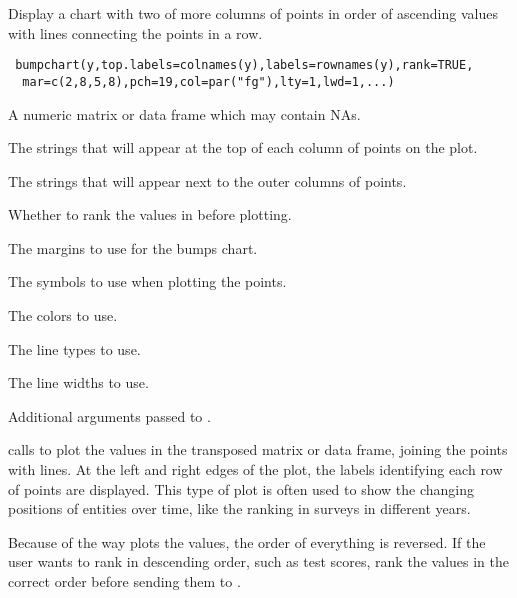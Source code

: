 \begin{Description}\relax
Display a chart with two of more columns of points in order of ascending values
with lines connecting the points in a row.
\end{Description}
\begin{Usage}
\begin{verbatim}
 bumpchart(y,top.labels=colnames(y),labels=rownames(y),rank=TRUE,
  mar=c(2,8,5,8),pch=19,col=par("fg"),lty=1,lwd=1,...)
\end{verbatim}
\end{Usage}
\begin{Arguments}
\begin{ldescription}
\item[\code{y}] A numeric matrix or data frame which may contain NAs.
\item[\code{top.labels}] The strings that will appear at the top of each column of
points on the plot.
\item[\code{labels}] The strings that will appear next to the outer columns of
points.
\item[\code{rank}] Whether to rank the values in  before plotting.
\item[\code{mar}] The margins to use for the bumps chart.
\item[\code{pch}] The symbols to use when plotting the points.
\item[\code{col}] The colors to use.
\item[\code{lty}] The line types to use.
\item[\code{lwd}] The line widths to use.
\item[\code{...}] Additional arguments passed to .
\end{ldescription}
\end{Arguments}
\begin{Details}\relax
{} calls  to plot the values in the transposed
 matrix or data frame, joining the points with lines. At the left and
right edges of the plot, the labels identifying each row of points are
displayed. This type of plot is often used to show the changing positions of
entities over time, like the ranking in surveys in different years.

Because of the way  plots the values, the order of everything is
reversed. If the user wants to rank in descending order, such as test scores,
rank the values in the correct order before sending them to .
\end{Details}
